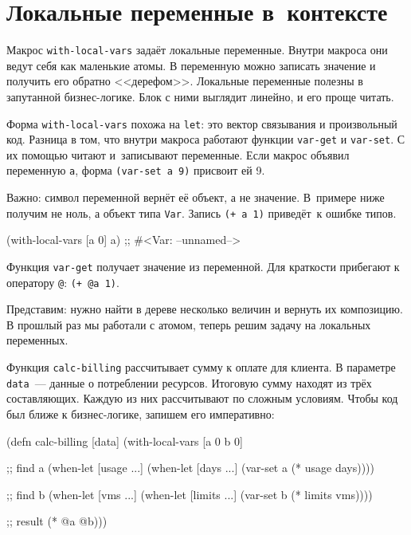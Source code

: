 \section{Локальные переменные в~контексте}


Макрос \verb|with-local-vars| задаёт локальные переменные. Внутри макроса они
ведут себя как маленькие атомы. В переменную можно записать значение и получить
его обратно <<дерефом>>. Локальные переменные полезны в запутанной
бизнес-логике. Блок с ними выглядит линейно, и его проще читать.

Форма \verb|with-local-vars| похожа на \verb|let|: это вектор связывания и
произвольный код. Разница в том, что внутри макроса работают функции
\verb|var-get| и \verb|var-set|. С их помощью читают и~записывают
переменные. Если макрос объявил переменную \verb|a|, форма \verb|(var-set a 9)|
присвоит ей 9.

Важно: символ переменной вернёт её объект, а не значение. В~примере ниже получим
не ноль, а объект типа \verb|Var|. Запись \verb|(+ a 1)| приведёт~к ошибке
типов.

\begin{english}
  \begin{clojure}
(with-local-vars [a 0] a)
;; #<Var: --unnamed-->
  \end{clojure}
\end{english}

Функция \verb|var-get| получает значение из переменной. Для краткости
прибегают к оператору \verb|@|: \verb|(+ @a 1)|.

Представим: нужно найти в дереве несколько величин и вернуть их композицию. В
прошлый раз мы работали с атомом, теперь решим задачу на локальных переменных.

Функция \verb|calc-billing| рассчитывает сумму к оплате для клиента. В параметре
\verb|data|~--- данные о потреблении ресурсов. Итоговую сумму находят из трёх
составляющих. Каждую из них рассчитывают по сложным условиям. Чтобы код был
ближе к бизнес-логике, запишем его императивно:

\begin{english}
  \begin{clojure}
(defn calc-billing [data]
  (with-local-vars
    [a 0 b 0]

    ;; find a
    (when-let [usage ...]
      (when-let [days ...]
        (var-set a (* usage days))))

    ;; find b
    (when-let [vms ...]
      (when-let [limits ...]
        (var-set b (* limits vms))))

    ;; result
    (* @a @b)))
  \end{clojure}
\end{english}

